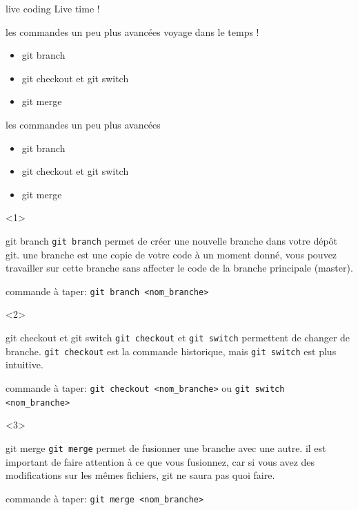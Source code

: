 \documentclass[usenames,dvipsnames]{beamer}
\begin{document}
\begin{frame}[fragile]{live coding}
	Live time !
\end{frame}

\begin{frame}[fragile]{les commandes un peu plus avancées}
	voyage dans le temps !
	\begin{itemize}
		\item git branch
		\item git checkout et git switch
		\item git merge
	\end{itemize}
\end{frame}

\begin{frame}[fragile]{les commandes un peu plus avancées}
	\begin{itemize}
		\item<1-3> git branch
		\item <2-3> git checkout et git switch
		\item <3-3> git merge
	\end{itemize}

	\begin{onlyenv}
		\begin{block}{git branch}
			\texttt{git branch} permet de créer une nouvelle branche dans votre dépôt git. une branche est une copie de votre code à un moment donné, vous pouvez travailler sur cette branche sans affecter le code de la branche principale (master).
		\end{block}

		commande à taper: \lstinline|git branch <nom_branche>|
	\end{onlyenv}

	\begin{onlyenv}
		\begin{block}{git checkout et git switch}
			\texttt{git checkout} et \texttt{git switch} permettent de changer de branche. \texttt{git checkout} est la commande historique, mais \texttt{git switch} est plus intuitive.
		\end{block}

		commande à taper: \lstinline|git checkout <nom_branche>| ou \lstinline|git switch <nom_branche>|
	\end{onlyenv}

	\begin{onlyenv}
		\begin{block}{git merge}
			\texttt{git merge} permet de fusionner une branche avec une autre. il est important de faire attention à ce que vous fusionnez, car si vous avez des modifications sur les mêmes fichiers, git ne saura pas quoi faire.
		\end{block}

		commande à taper: \lstinline|git merge <nom_branche>|
	\end{onlyenv}
\end{frame}
\end{document}
